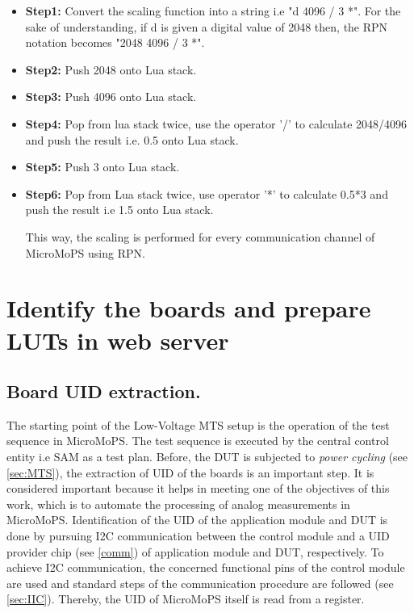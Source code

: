 \begin{itemize}[label={}]
\item \textbf{Step1:} Convert the scaling function into a string i.e "d 4096 / 3 *". For the sake of understanding, if d is given a digital value of 2048 then, the RPN notation becomes "2048 4096 / 3 *". 
\item \textbf{Step2:} Push 2048 onto Lua stack.
\item \textbf{Step3:} Push 4096 onto Lua stack.
\item \textbf{Step4:} Pop from lua stack twice, use the operator '/' to calculate 2048/4096 and push the result i.e. 0.5 onto Lua stack. 
\item \textbf{Step5:} Push 3 onto Lua stack.
\item \textbf{Step6:} Pop from Lua stack twice, use operator '*' to calculate 0.5*3 and push the result i.e 1.5 onto Lua stack.

This way, the scaling is performed for every communication channel of MicroMoPS using RPN.
\end{itemize}

\section{Identify the boards and prepare \glspl{LUT} in web server}\label{sec:identification}

\subsection{Board UID extraction.}\label{sec:identify}
The starting point of the Low-Voltage MTS setup is the operation of the test sequence in MicroMoPS.
The test sequence is executed by the central control entity i.e \acrshort{SAM} as a test plan.
Before, the DUT is subjected to \emph{power cycling} (see \cref{sec:MTS}), the extraction of \acrshort{UID} of the boards is an important step.
It is considered important because it helps in meeting one of the objectives of this work, which is to automate the processing of analog measurements in MicroMoPS.
Identification of the UID of the application module and DUT is done by pursuing I2C communication between the control module and a UID provider chip (see \cref{comm}) of application module and DUT, respectively.
To achieve I2C communication, the concerned functional pins of the control module are used and standard steps of the communication procedure are followed (see \cref{sec:IIC}).
Thereby, the UID of MicroMoPS itself is read from a register.
